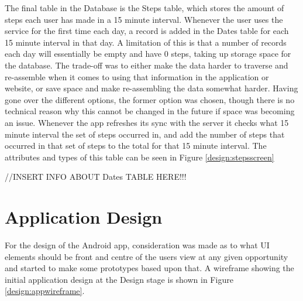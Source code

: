 \documentclass{l4proj}
\begin{document}
The final table in the Database is the Steps table, which stores the amount of steps each user has made in a 15 minute interval. Whenever the user uses the service for the first time each day, a record is added in the Dates table for each 15 minute interval in that day. A limitation of this is that a number of records each day will essentially be empty and have 0 steps, taking up storage space for the database. The trade-off was to either make the data harder to traverse and re-assemble when it comes to using that information in the application or website, or save space and make re-assembling the data somewhat harder. Having gone over the different options, the former option was chosen, though there is no technical reason why this cannot be changed in the future if space was becoming an issue. Whenever the app refreshes its sync with the server it checks what 15 minute interval the set of steps occurred in, and add the number of steps that occurred in that set of steps to the total for that 15 minute interval. The attributes and types of this table can be seen in Figure \ref{design:stepsscreen}

//INSERT INFO ABOUT Dates TABLE HERE!!!

\section{Application Design}

For the design of the Android app, consideration was made as to what UI elements should be front and centre of the users view at any given opportunity and started to make some prototypes based upon that. A wireframe showing the initial application design at the Design stage is shown in Figure \ref{design:appwireframe}.
\end{document}
